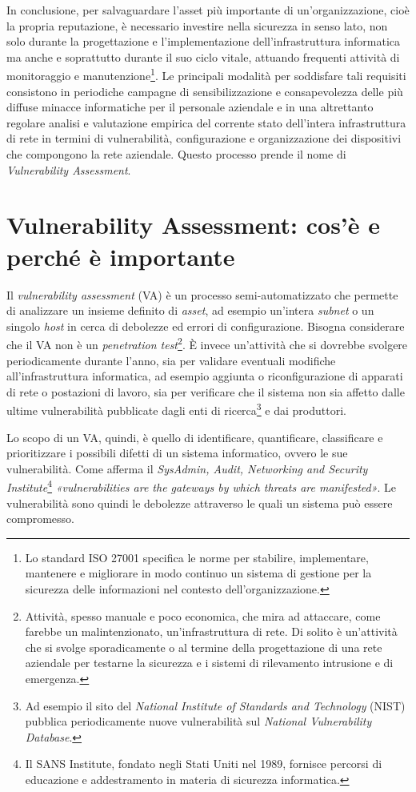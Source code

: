 \documentclass[target=bach,aauheader=]{thud}
\begin{document}
In conclusione, per salvaguardare l’asset più importante di un’organizzazione, cioè la propria reputazione, è necessario investire nella sicurezza in senso lato, non solo durante la progettazione e l’implementazione dell’infrastruttura informatica ma anche e soprattutto durante il suo ciclo vitale, attuando frequenti attività di monitoraggio e manutenzione\footnote{Lo standard ISO 27001 specifica le norme per stabilire, implementare, mantenere e migliorare in modo continuo un sistema di gestione per la sicurezza delle informazioni nel contesto dell’organizzazione.}. Le principali modalità per soddisfare tali requisiti consistono in periodiche campagne di sensibilizzazione e consapevolezza delle più diffuse minacce informatiche per il personale aziendale e in una altrettanto regolare analisi e valutazione empirica del corrente stato dell’intera infrastruttura di rete in termini di vulnerabilità, configurazione e organizzazione dei dispositivi che compongono la rete aziendale.
Questo processo prende il nome di \textit{Vulnerability Assessment}.


\chapter{Vulnerability Assessment: cos’è e perché è importante}

Il \textit{vulnerability assessment} (VA) è un processo semi-automatizzato che permette di analizzare un insieme definito di \textit{asset}, ad esempio un’intera \textit{subnet} o un singolo \textit{host} in cerca di debolezze ed errori di configurazione. Bisogna considerare che il VA non è un \textit{penetration test}\footnote{Attività, spesso manuale e poco economica, che mira ad attaccare, come farebbe un malintenzionato, un’infrastruttura di rete. Di solito è un’attività che si svolge sporadicamente o al termine della progettazione di una rete aziendale per testarne la sicurezza e i sistemi di rilevamento intrusione e di emergenza.}. È invece un’attività che si dovrebbe svolgere periodicamente durante l’anno, sia per validare eventuali modifiche all’infrastruttura informatica, ad esempio aggiunta o riconfigurazione di apparati di rete o postazioni di lavoro, sia per verificare che il sistema non sia affetto dalle ultime vulnerabilità pubblicate dagli enti di ricerca\footnote{Ad esempio il sito del \textit{National Institute of Standards and Technology} (NIST) pubblica periodicamente nuove vulnerabilità sul \textit{National Vulnerability Database}.} e dai produttori.

Lo scopo di un VA, quindi, è quello di identificare, quantificare, classificare e prioritizzare i possibili difetti di un sistema informatico, ovvero le sue vulnerabilità. Come afferma il \textit{SysAdmin, Audit, Networking and Security Institute}\footnote{Il SANS Institute, fondato negli Stati Uniti nel 1989, fornisce percorsi di educazione e addestramento in materia di sicurezza informatica.} \textit{«vulnerabilities are the gateways by which threats are manifested»}. Le vulnerabilità sono quindi le debolezze attraverso le quali un sistema può essere compromesso.
\end{document}
